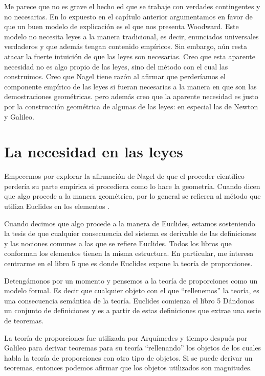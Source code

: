 Me parece que no es grave el hecho ed que se trabaje con verdades contingentes y no necesarias. En lo expuesto en el capítulo anterior argumentamos en favor de que un buen modelo de explicación es el que nos presenta Woodward. Este modelo no necesita leyes a la manera tradicional, es decir, enunciados universales verdaderos y que además tengan contenido empíricos. Sin embargo, aún resta atacar la fuerte intuición de que las leyes son necesarias. Creo que esta aparente necesidad no es algo propio de las leyes, sino del método con el cual las construimos. Creo que Nagel tiene razón al afirmar que perderíamos el componente empírico de las leyes si fueran necesarias a la manera en que son las demostraciones geométricas. pero además creo que la aparente necesidad es justo por la construcción geométrica de algunas de las leyes: en especial las de Newton y Galileo.

\section{La necesidad en las leyes}

\noindent Empecemos por explorar la afirmación de Nagel de que el proceder científico perdería su parte empírica si procediera como lo hace la geometría. Cuando dicen que algo procede a la manera geométrica, por lo general se refieren al método que utiliza Euclides en los elementos \cite{Euclid2008}.

Cuando decimos que algo procede a la manera de Euclides, estamos sosteniendo la tesis de que cualquier consecuencia del sistema es derivable de las definiciones y las nociones comunes a las que se refiere Euclides. Todos los libros que conforman los elementos tienen la misma estructura. En particular, me interesa centrarme en el libro 5 que es donde Euclides expone la teoría de proporciones.

Detengámonos por un momento y pensemos a la teoría de proporciones como un modelo formal. Es decir que cualquier objeto con el que ``rellenemos'' la teoría, es una consecuencia semántica de la teoría. Euclides comienza el libro 5 Dándonos un conjunto de definiciones y es a partir de estas definiciones que extrae una serie de teoremas.

La teoría de proporciones fue utilizada por Arquímedes y tiempo después por Galileo para derivar teoremas para su teoría ``rellenando'' los objetos de los cuales habla la teoría de proporciones con otro tipo de objetos. Si se puede derivar un teoremas, entonces podemos afirmar que los objetos utilizados son magnitudes.

